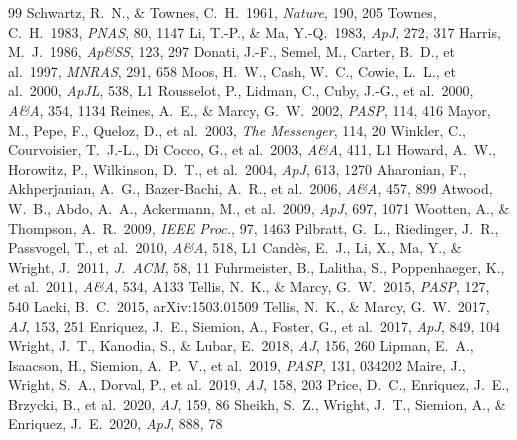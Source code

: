 \documentclass[twocolumn,10pt]{article}
\begin{document}
\begin{thebibliography}{99}
\footnotesize
\setlength{\itemsep}{0.15pt}
\setlength{\parskip}{0pt}
 Schwartz, R.~N., \& Townes, C.~H.\ 1961, \textit{Nature}, 190, 205
 Townes, C.~H.\ 1983, \textit{PNAS}, 80, 1147
 Li, T.-P., \& Ma, Y.-Q.\ 1983, \textit{ApJ}, 272, 317
 Harris, M.~J.\ 1986, \textit{Ap\&SS}, 123, 297
 Donati, J.-F., Semel, M., Carter, B.~D., et al.\ 1997, \textit{MNRAS}, 291, 658
 Moos, H.~W., Cash, W.~C., Cowie, L.~L., et al.\ 2000, \textit{ApJL}, 538, L1
 Rousselot, P., Lidman, C., Cuby, J.-G., et al.\ 2000, \textit{A\&A}, 354, 1134
 Reines, A.~E., \& Marcy, G.~W.\ 2002, \textit{PASP}, 114, 416
 Mayor, M., Pepe, F., Queloz, D., et al.\ 2003, \textit{The Messenger}, 114, 20
 Winkler, C., Courvoisier, T.~J.-L., Di Cocco, G., et al.\ 2003, \textit{A\&A}, 411, L1
 Howard, A.~W., Horowitz, P., Wilkinson, D.~T., et al.\ 2004, \textit{ApJ}, 613, 1270
 Aharonian, F., Akhperjanian, A.~G., Bazer-Bachi, A.~R., et al.\ 2006, \textit{A\&A}, 457, 899
 Atwood, W.~B., Abdo, A.~A., Ackermann, M., et al.\ 2009, \textit{ApJ}, 697, 1071
 Wootten, A., \& Thompson, A.~R.\ 2009, \textit{IEEE Proc.}, 97, 1463
 Pilbratt, G.~L., Riedinger, J.~R., Passvogel, T., et al.\ 2010, \textit{A\&A}, 518, L1
 Cand\`{e}s, E.~J., Li, X., Ma, Y., \& Wright, J.\ 2011, \textit{J.\ ACM}, 58, 11
 Fuhrmeister, B., Lalitha, S., Poppenhaeger, K., et al.\ 2011, \textit{A\&A}, 534, A133
 Tellis, N.~K., \& Marcy, G.~W.\ 2015, \textit{PASP}, 127, 540
 Lacki, B.~C.\ 2015, arXiv:1503.01509
 Tellis, N.~K., \& Marcy, G.~W.\ 2017, \textit{AJ}, 153, 251
 Enriquez, J.~E., Siemion, A., Foster, G., et al.\ 2017, \textit{ApJ}, 849, 104
 Wright, J.~T., Kanodia, S., \& Lubar, E.\ 2018, \textit{AJ}, 156, 260
 Lipman, E.~A., Isaacson, H., Siemion, A.~P.~V., et al.\ 2019, \textit{PASP}, 131, 034202
 Maire, J., Wright, S.~A., Dorval, P., et al.\ 2019, \textit{AJ}, 158, 203
 Price, D.~C., Enriquez, J.~E., Brzycki, B., et al.\ 2020, \textit{AJ}, 159, 86
 Sheikh, S.~Z., Wright, J.~T., Siemion, A., \& Enriquez, J.~E.\ 2020, \textit{ApJ}, 888, 78

\end{thebibliography}
\end{document}
